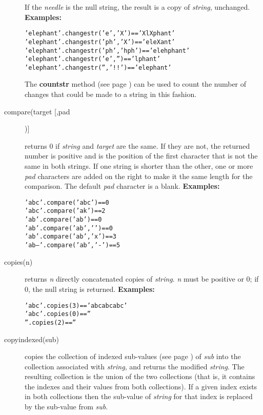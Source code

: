 \begin{description}
If the \emph{needle} is the null string, the result is a copy of
\emph{string}, unchanged.
 \textbf{Examples:}
\begin{alltt}
'elephant'.changestr('e','X')    == 'XlXphant'
'elephant'.changestr('ph','X')   == 'eleXant'
'elephant'.changestr('ph','hph') == 'elehphant'
'elephant'.changestr('e','')     == 'lphant'
'elephant'.changestr('','!!')    == 'elephant'
\end{alltt}
 The  \textbf{countstr} method (see page \pageref{refcoustr})  can be used to
count the number of changes that could be made to a string in this
fashion.
\item[compare(target [,pad])]\label{refcompar}

returns 0 if \emph{string} and \emph{target}
are the same.
If they are not, the returned number is positive and is the position of
the first character that is not the same in both strings.
If one string is shorter than the other, one or more \emph{pad}
characters are added on the right to make it the same length for the
comparison.
The default \emph{pad} character is a blank.
 \textbf{Examples:}
\begin{alltt}
'abc'.compare('abc')      == 0
'abc'.compare('ak')       == 2
'ab '.compare('ab')       == 0
'ab '.compare('ab',' ')   == 0
'ab '.compare('ab','x')   == 3
'ab-- '.compare('ab','-') == 5
\end{alltt}
\item[copies(n)]\label{refcopies}

returns \emph{n} directly concatenated copies of
\emph{string}.
\emph{n} must be positive or 0; if 0, the null string is returned.
 \textbf{Examples:}
\begin{alltt}
'abc'.copies(3) == 'abcabcabc'
'abc'.copies(0) == ''
''.copies(2)    == ''
\end{alltt}
\item[copyindexed(sub)]\label{refcopyind}
copies the collection of indexed  sub-values (see page \pageref{refinstr}) 
of \emph{sub} into the collection associated with
\emph{string}, and returns the modified \emph{string}.  The
resulting collection is the union of the two collections (that is,
it contains the indexes and their values from both collections).
If a given index exists in both collections then the sub-value of
\emph{string} for that index is replaced by the sub-value from
\emph{sub}.
 

\end{description}
